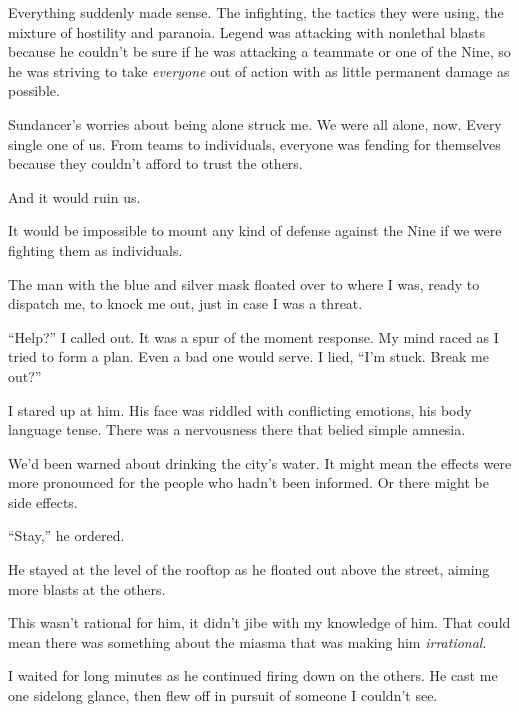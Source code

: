 Everything suddenly made sense.  The infighting, the tactics they were using, the mixture of hostility and paranoia.  Legend was attacking with nonlethal blasts because he couldn't be sure if he was attacking a teammate or one of the Nine, so he was striving to take \emph{everyone} out of action with as little permanent damage as possible.



Sundancer's worries about being alone struck me.  We were all alone, now.  Every single one of us.  From teams to individuals, everyone was fending for themselves because they couldn't afford to trust the others.



And it would ruin us.



It would be impossible to mount any kind of defense against the Nine if we were fighting them as individuals.



The man with the blue and silver mask floated over to where I was, ready to dispatch me, to knock me out, just in case I was a threat.



``Help?''  I called out.  It was a spur of the moment response.  My mind raced as I tried to form a plan.  Even a bad one would serve.  I lied, ``I'm stuck.  Break me out?''



I stared up at him.  His face was riddled with conflicting emotions, his body language tense.  There was a nervousness there that belied simple amnesia.



We'd been warned about drinking the city's water.  It might mean the effects were more pronounced for the people who hadn't been informed.  Or there might be side effects.



``Stay,'' he ordered.



He stayed at the level of the rooftop as he floated out above the street, aiming more blasts at the others.



This wasn't rational for him, it didn't jibe with my knowledge of him.  That could mean there was something about the miasma that was making him \emph{irrational}.



I waited for long minutes as he continued firing down on the others.  He cast me one sidelong glance, then flew off in pursuit of someone I couldn't see.



